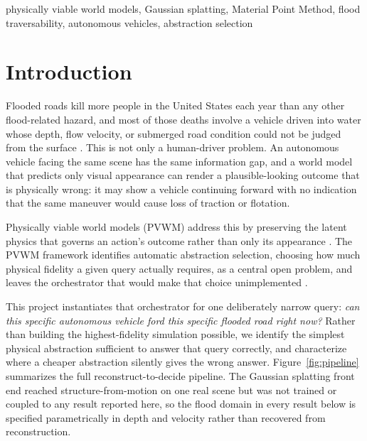 \documentclass[conference]{IEEEtran}
\begin{document}
\begin{IEEEkeywords}
physically viable world models, Gaussian splatting, Material Point Method, flood traversability, autonomous vehicles, abstraction selection
\end{IEEEkeywords}

\section{Introduction}

Flooded roads kill more people in the United States each year than any other flood-related hazard, and most of those deaths involve a vehicle driven into water whose depth, flow velocity, or submerged road condition could not be judged from the surface \cite{nws_tadd}. This is not only a human-driver problem. An autonomous vehicle facing the same scene has the same information gap, and a world model that predicts only visual appearance can render a plausible-looking outcome that is physically wrong: it may show a vehicle continuing forward with no indication that the same maneuver would cause loss of traction or flotation.

Physically viable world models (PVWM) address this by preserving the latent physics that governs an action's outcome rather than only its appearance \cite{thorpe2026pvwm}. The PVWM framework identifies automatic abstraction selection, choosing how much physical fidelity a given query actually requires, as a central open problem, and leaves the orchestrator that would make that choice unimplemented \cite{thorpe2026pvwm}.

This project instantiates that orchestrator for one deliberately narrow query: \emph{can this specific autonomous vehicle ford this specific flooded road right now?} Rather than building the highest-fidelity simulation possible, we identify the simplest physical abstraction sufficient to answer that query correctly, and characterize where a cheaper abstraction silently gives the wrong answer. Figure~\ref{fig:pipeline} summarizes the full reconstruct-to-decide pipeline. The Gaussian splatting front end reached structure-from-motion on one real scene but was not trained or coupled to any result reported here, so the flood domain in every result below is specified parametrically in depth and velocity rather than recovered from reconstruction.
\end{document}
